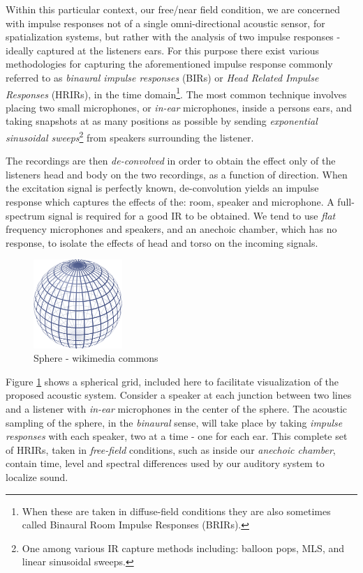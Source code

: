 Within this particular context, our free/near field condition, we are concerned with impulse responses not of a single omni-directional acoustic sensor, for spatialization systems, but rather with the analysis of two impulse responses - ideally captured at the listeners ears. For this purpose there exist various methodologies for capturing the aforementioned impulse response commonly referred to as \textit{binaural impulse responses} (BIRs) or \textit{Head Related Impulse Responses} (HRIRs), in the time domain\footnote{When these are taken in diffuse-field conditions they are also sometimes called Binaural Room Impulse Responses (BRIRs).}. The most common technique involves placing two small microphones, or \textit{in-ear} microphones, inside a persons ears, and taking snapshots at as many positions as possible by sending \textit{exponential sinusoidal sweeps}\footnote{One among various IR capture methods including: balloon pops, MLS, and linear sinusoidal sweeps.} from speakers surrounding the listener. 

The recordings are then \textit{de-convolved} in order to obtain the effect only of the listeners head and body on the two recordings, as a function of direction. When the excitation signal is perfectly known, de-convolution yields an impulse response which captures the effects of the: room, speaker and microphone. A full-spectrum signal is required for a good IR to be obtained. We tend to use \textit{flat} frequency microphones and speakers, and an anechoic chamber, which has no response, to isolate the effects of head and torso on the incoming signals.

\begin{figure}[ht!]%
\centering
\includegraphics[width=0.3\textwidth]{img/sphere-png.png} 
\caption{Sphere - wikimedia commons}
\label{fig:sphere}
\end{figure}

Figure \ref{fig:sphere} shows a spherical grid, included here to facilitate visualization of the proposed acoustic system. Consider a speaker at each junction between two lines and a listener with \textit{in-ear} microphones in the center of the sphere. The acoustic sampling of the sphere, in the \textit{binaural} sense, will take place by taking \textit{impulse responses} with each speaker, two at a time - one for each ear. This complete set of HRIRs, taken in \textit{free-field} conditions, such as inside our \textit{anechoic chamber}, contain time, level and spectral differences used by our auditory system to localize sound. 

